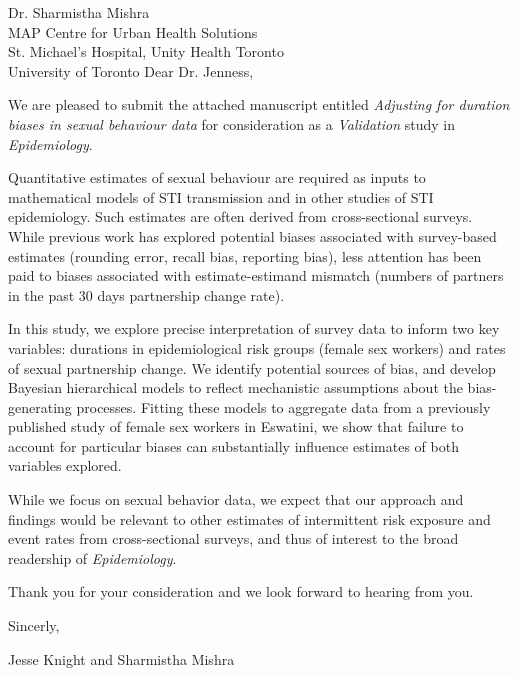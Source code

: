 \address{
  Dr. Samuel Jenness\\
  Editor\\
  Epidemiology
}{Dr. Sharmistha Mishra\\
  MAP Centre for Urban Health Solutions\\
  St. Michael's Hospital, Unity Health Toronto\\
  University of Toronto}
Dear Dr. Jenness,
\par
We are pleased to submit the attached manuscript entitled
\emph{Adjusting for duration biases in sexual behaviour data}
for consideration as a \emph{Validation} study in \emph{Epidemiology}.
\par
Quantitative estimates of sexual behaviour are required
as inputs to mathematical models of STI transmission and in other studies of STI epidemiology.
Such estimates are often derived from cross-sectional surveys.
While previous work has explored potential biases associated with survey-based estimates
(\eg rounding error, recall bias, reporting bias),
less attention has been paid to biases associated with estimate-estimand mismatch
(\eg numbers of partners in the past 30 days \vs partnership change rate).
\par
In this study, we explore precise interpretation of survey data to inform two key variables:
durations in epidemiological risk groups (\eg female sex workers) and
rates of sexual partnership change.
We identify potential sources of bias,
and develop Bayesian hierarchical models to reflect
mechanistic assumptions about the bias-generating processes.
Fitting these models to aggregate data from
a previously published study of female sex workers in Eswatini,
we show that failure to account for particular biases can
substantially influence estimates of both variables explored.
\par
While we focus on sexual behavior data,
we expect that our approach and findings would be relevant to
other estimates of intermittent risk exposure and event rates from cross-sectional surveys,
and thus of interest to the broad readership of \emph{Epidemiology}.
\par
Thank you for your consideration and we look forward to hearing from you.
\medskip\par
Sincerly,
\par
Jesse Knight and Sharmistha Mishra